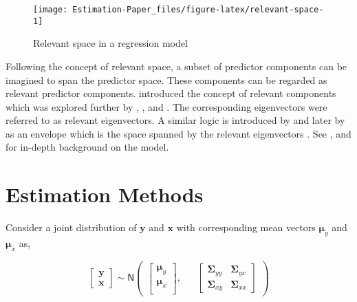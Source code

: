\documentclass[12pt,3p,authoryear]{elsarticle}
\begin{document}
\begin{figure}

{\centering \texttt{[image: Estimation-Paper\_files/figure-latex/relevant-space-1]} 

}

\caption{Relevant space in a regression model}\label{fig:relevant-space}
\end{figure}

Following the concept of relevant space, a subset of predictor components can be imagined to span the predictor space. These components can be regarded as relevant predictor components. \citet{Naes1985} introduced the concept of relevant components which was explored further by \citet{helland1990partial}, \citet{naes1993relevant}, \citet{Helland1994b} and \citet{Helland2000}. The corresponding eigenvectors were referred to as relevant eigenvectors. A similar logic is introduced by \citet{cook2010envelope} and later by \citet{cook2013envelopes} as an envelope which is the space spanned by the relevant eigenvectors \citep[, p.101]{cook2018envelope}. See \citet{Rimal2018}, \citet{saebo2015simrel} and \citet{rimal2019pred} for in-depth background on the model.

\hypertarget{estimation-methods}{%
\section{Estimation Methods}\label{estimation-methods}}

Consider a joint distribution of \(\mathbf{y}\) and \(\mathbf{x}\) with corresponding mean vectors \(\boldsymbol{\mu}_y\) and \(\boldsymbol{\mu}_x\) as,

\begin{equation}
\begin{bmatrix}
\mathbf{y} \\ \mathbf{x}
\end{bmatrix} \sim \mathsf{N}
\begin{pmatrix}
\begin{bmatrix}
\boldsymbol{\mu}_y \\
\boldsymbol{\mu}_x \\
\end{bmatrix}, &&
\begin{bmatrix}
\boldsymbol{\Sigma}_{yy} & \boldsymbol{\Sigma}_{yx} \\
\boldsymbol{\Sigma}_{xy} & \boldsymbol{\Sigma}_{xx} 
\end{bmatrix}
\end{pmatrix}
\label{eq:model-1}
\end{equation}
\end{document}
